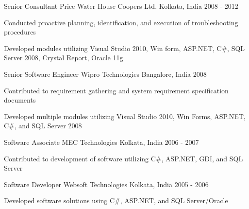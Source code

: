 \begin{cventries}
  \cventry
    {Senior Consultant} %
    {Price Water House Coopers Ltd.} %
    {Kolkata, India} %
    {2008 - 2012} %
    {
      \begin{cvitems} %
        \item {Conducted proactive planning, identification, and execution of troubleshooting procedures}
        \item {Developed modules utilizing Visual Studio 2010, Win form, ASP.NET, C\#, SQL Server 2008, Crystal Report, Oracle 11g}\\
      \end{cvitems}
    }

  \cventry
    {Senior Software Engineer} %
    {Wipro Technologies} %
    {Bangalore, India} %
    {2008} %
    {
      \begin{cvitems} %
        \item {Contributed to requirement gathering and system requirement specification documents}
        \item {Developed multiple modules utilizing Visual Studio 2010, Win Forms, ASP.NET, C\#, and SQL Server 2008}\\
      \end{cvitems}
    }

  \cventry
    {Software Associate} %
    {MEC Technologies} %
    {Kolkata, India} %
    {2006 - 2007} %
    {
      \begin{cvitems} %
        \item {Contributed to development of software utilizing C\#, ASP.NET, GDI, and SQL Server}\\
      \end{cvitems}
    }

  \cventry
    {Software Developer} %
    {Websoft Technologies} %
    {Kolkata, India} %
    {2005 - 2006} %
    {
      \begin{cvitems} %
        \item {Developed software solutions using C\#, ASP.NET, and SQL Server/Oracle}\\
      \end{cvitems}
    }

\end{cventries}
